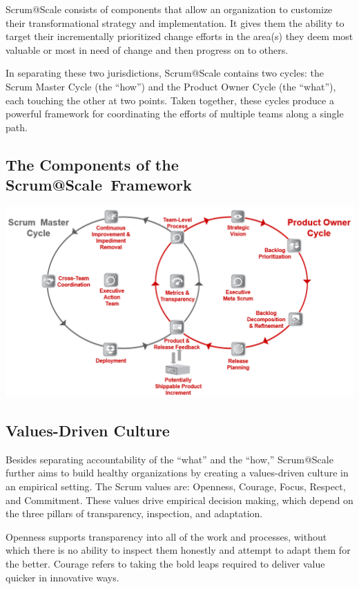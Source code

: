 \documentclass[12pt,a4paper,parskip=full]{scrartcl}
\begin{document}
Scrum@Scale consists of components that allow an organization to
customize their transformational strategy and implementation. It gives them
the ability to target their incrementally prioritized change efforts in the area(s) they deem
most valuable or most in need of change and then progress on to others.

In separating these two jurisdictions, Scrum@Scale contains two cycles: the
Scrum Master Cycle (the ``how'') and the Product Owner Cycle (the
``what''), each touching the other at two points. Taken together, these
cycles produce a powerful framework for coordinating the efforts of
multiple teams along a single path.

\subsection{The Components of the Scrum@Scale\textregistered ~Framework}

\includegraphics[width=1.0\linewidth]{SMPO-Cycle.png}

\subsection{Values-Driven Culture}
Besides separating accountability of the ``what'' and the ``how,''
Scrum@Scale further aims to build healthy organizations by creating a
values-driven culture in an empirical setting. The Scrum values are:
Openness, Courage, Focus, Respect, and Commitment. These values drive
empirical decision making, which depend on the three pillars of
transparency, inspection, and adaptation.

Openness supports transparency into all of the work and processes, without
which there is no ability to inspect them honestly and attempt to adapt
them for the better. Courage refers to taking the bold leaps required to
deliver value quicker in innovative ways.
\end{document}
